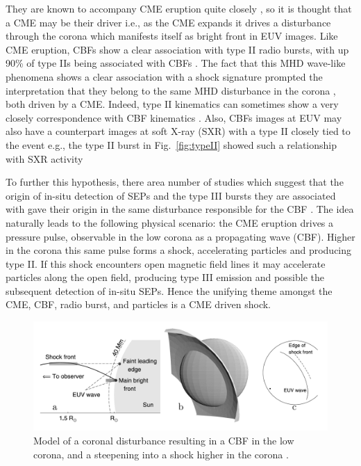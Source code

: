 They are known to accompany CME eruption quite closely \citep{bieseker2002}, so it is thought that a CME may be their driver i.e., as the CME expands it drives a disturbance through the corona which manifests itself as bright front in EUV images. Like CME eruption, CBFs show a clear association with type II radio bursts, with up 90\% of type IIs being associated with CBFs \citep{klassen2000}. The fact that this MHD wave-like phenomena shows a clear association with a shock signature prompted the interpretation that they belong to the same MHD disturbance in the corona \citep{warmuth2004b}, both driven by a CME. Indeed, type II kinematics can sometimes show a very closely correspondence with CBF kinematics \citep{vrsna2005, grechnev2011}. Also, CBFs images at EUV may also have a counterpart images at soft X-ray (SXR) with a type II closely tied to the event e.g., the type II burst in Fig.~\ref{fig:typeII} showed such a relationship with SXR activity \citep{khan2002}


To further this hypothesis, there area number of studies which suggest that the origin of in-situ detection of SEPs and the type III bursts they are associated with gave their origin in the same disturbance responsible for the CBF \citep{klassen2002, krucker1999, kozarev2011}. The idea naturally leads to the following physical scenario: the CME eruption drives a pressure pulse, observable in the low corona as a propagating wave (CBF). Higher in the corona this same pulse forms a shock, accelerating particles and producing type II. If this shock encounters open magnetic field lines it may accelerate particles along the open field, producing type III emission and possible the subsequent detection of in-situ SEPs. Hence the unifying theme amongst the CME, CBF, radio burst, and particles is a CME driven shock.
\begin{figure}[!t]
\begin{center}
\includegraphics[scale=0.25, trim=1cm 0cm 0cm 2cm]{images/shock_sim}
\caption[Model of EUV wave and coronal shock]{Model of a coronal disturbance resulting in a CBF in the low corona, and a steepening into a shock higher in the corona \citep{grechnev2011a}.}
\label{fig:shock_cbf}
\end{center}
\end{figure}

